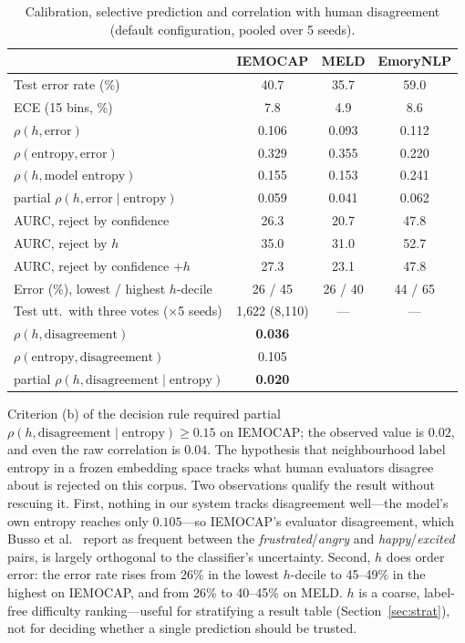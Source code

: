 \documentclass[journal]{IEEEtran}
\begin{document}
\begin{table}[t]\centering\footnotesize\setlength{\tabcolsep}{3pt}
\caption{Calibration, selective prediction and correlation with human disagreement (default configuration, pooled over 5 seeds).}\label{tab:conf}
\begin{tabular}{lccc}\toprule
 & IEMOCAP & MELD & EmoryNLP \\ \midrule
Test error rate (\%) & 40.7 & 35.7 & 59.0 \\
ECE (15 bins, \%) & 7.8 & 4.9 & 8.6 \\
$\rho(h, \text{error})$ & 0.106 & 0.093 & 0.112 \\
$\rho(\text{entropy}, \text{error})$ & 0.329 & 0.355 & 0.220 \\
$\rho(h, \text{model entropy})$ & 0.155 & 0.153 & 0.241 \\
partial $\rho(h, \text{error} \mid \text{entropy})$ & 0.059 & 0.041 & 0.062 \\
AURC, reject by confidence & 26.3 & 20.7 & 47.8 \\
AURC, reject by $h$ & 35.0 & 31.0 & 52.7 \\
AURC, reject by confidence $+ h$ & 27.3 & 23.1 & 47.8 \\
Error (\%), lowest / highest $h$-decile & 26 / 45 & 26 / 40 & 44 / 65 \\
Test utt.\ with three votes ($\times$5 seeds) & 1{,}622 (8{,}110) & --- & --- \\
$\rho(h, \text{disagreement})$ & \textbf{0.036} & & \\
$\rho(\text{entropy}, \text{disagreement})$ & 0.105 & & \\
partial $\rho(h, \text{disagreement} \mid \text{entropy})$ & \textbf{0.020} & & \\ \bottomrule
\end{tabular}
\end{table}

Criterion (b) of the decision rule required partial $\rho(h, \text{disagreement} \mid \text{entropy}) \geq 0.15$ on IEMOCAP; the observed value is $0.02$, and even the raw correlation is $0.04$. The hypothesis that neighbourhood label entropy in a frozen embedding space tracks what human evaluators disagree about is rejected on this corpus. Two observations qualify the result without rescuing it. First, nothing in our system tracks disagreement well---the model's own entropy reaches only $0.105$---so IEMOCAP's evaluator disagreement, which Busso et al.~\cite{busso2008iemocap} report as frequent between the \emph{frustrated}/\emph{angry} and \emph{happy}/\emph{excited} pairs, is largely orthogonal to the classifier's uncertainty. Second, $h$ does order error: the error rate rises from 26\% in the lowest $h$-decile to 45--49\% in the highest on IEMOCAP, and from 26\% to 40--45\% on MELD. $h$ is a coarse, label-free difficulty ranking---useful for stratifying a result table (Section~\ref{sec:strat}), not for deciding whether a single prediction should be trusted.
\end{document}
